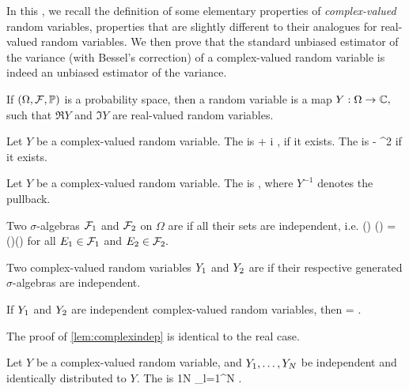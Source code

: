 In this , we recall the definition of some elementary properties of \emph{complex-valued} random variables, properties that are slightly different to their analogues for real-valued random variables. We then prove that the standard unbiased estimator of the variance (with Bessel's correction) of a complex-valued random variable  is indeed an unbiased estimator of the variance.

If $\OFP$ is a probability space, then a  random variable is a map $Y:\Omega\rightarrow \mathbb C,$ such that $\Re Y$ and $\Im Y$ are real-valued random variables.
\ede

Let $Y$ be a complex-valued random variable. The  is
\beqs
{} \de {} + i ,
\eeqs
if it exists. The  is
\beqs
{} \de {} - ^2
\eeqs
if it exists.
\ede

Let $Y$ be a complex-valued random variable. The  is
\beqs
{} \de {},
\eeqs
where $Y^{-1}$ denotes the pullback.
\ede

Two $\sigma$-algebras $\mathcal F_{1}$ and $\mathcal F_{2}$ on $\Omega$ are  if all their sets are independent, i.e.
\beqs
\PP\mleft(\Eo\mright) \cap \PP\mleft(\Et\mright) = \PP\mleft(\Eo\mright)\PP\mleft(\Et\mright)
\eeqs
for all $E_{1} \in \mathcal F_{1}$ and $E_{2} \in \mathcal F_{2}.$
\ede

Two complex-valued random variables $Y_{1}$ and $Y_{2}$ are  if their respective generated $\sigma$-algebras are independent.
\ede

\label{lem:complexindep}
If $Y_{1}$ and $Y_{2}$ are independent complex-valued random variables, then
\beqs
\EXP{\Yo\Ytbar} = \EXP{\Yo}\EXP{\Ytbar}.
\eeqs
\ele

The proof of \cref{lem:complexindep} is identical to the real case.

Let $Y$ be a complex-valued random variable, and $Y_{1},\ldots,Y_{N}$ be independent and identically distributed to $Y$. The  is
\beqs
\Yhat \de\frac1N \sum_{l=1}^N \Yl.
\eeqs
\ede

